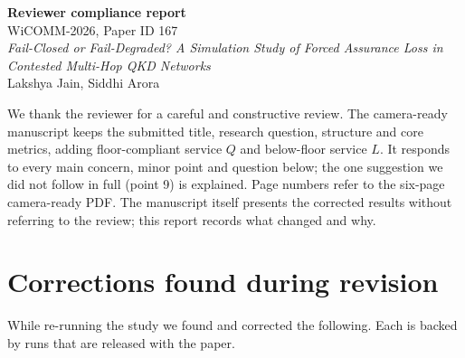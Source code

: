 \documentclass[10pt,a4paper]{article}
\begin{document}
\begin{center}
{\large\bfseries Reviewer compliance report}\\[2pt]
WiCOMM-2026, Paper ID 167\\
\emph{Fail-Closed or Fail-Degraded? A Simulation Study of Forced Assurance Loss in
Contested Multi-Hop QKD Networks}\\[2pt]
Lakshya Jain, Siddhi Arora
\end{center}

We thank the reviewer for a careful and constructive review. The camera-ready
manuscript keeps the submitted title, research question, structure and core metrics,
adding floor-compliant service $Q$ and below-floor service $L$. It responds to every
main concern, minor point and question below; the one suggestion we did not follow in
full (point 9) is explained. Page numbers refer to the six-page camera-ready PDF. The
manuscript itself presents the corrected results without referring to the review;
this report records what changed and why.

\section*{Corrections found during revision}
While re-running the study we found and corrected the following. Each is backed by
runs that are released with the paper.
\end{document}

